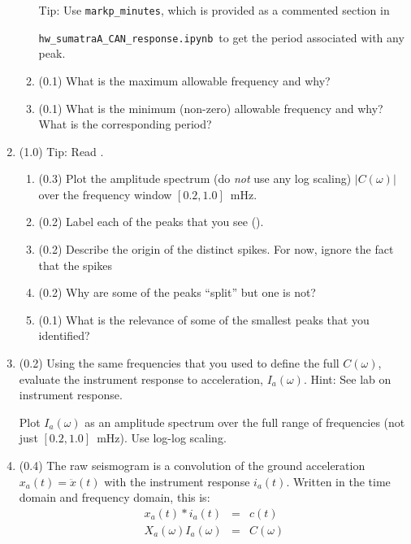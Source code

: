 \documentclass[11pt,titlepage,fleqn]{article}
\newcommand{\tfileresponse}{{\tt hw\_sumatraA\_CAN\_response.ipynb}}
\begin{document}
\begin{enumerate}
\begin{enumerate}
Tip: Use \verb+markp_minutes+, which is provided as a commented section in 

\tfileresponse\ to get the period associated with any peak.


\item (0.1) What is the maximum allowable frequency and why?
\item (0.1) What is the minimum (non-zero) allowable frequency and why? \\
What is the corresponding period?
\end{enumerate}


\item (1.0) Tip: Read \citet{Park2005}.

\begin{enumerate}
\item (0.3) Plot the amplitude spectrum (do {\em not} use any log scaling) $|C(\omega)|$ over the frequency window $[0.2,1.0]$~mHz.
\item (0.2) Label each of the peaks that you see (\eg {}).

\item (0.2) Describe the origin of the distinct spikes. For now, ignore the fact that the spikes 

\item (0.2) Why are some of the peaks ``split'' but one is not?

\item (0.1) What is the relevance of some of the smallest peaks that you identified?
\end{enumerate}


\item (0.2) Using the same frequencies that you used to define the full $C(\omega)$, evaluate the instrument response to acceleration, $I_a(\omega)$. Hint: See lab on instrument response.

Plot $I_a(\omega)$ as an amplitude spectrum over the full range of frequencies (not just $[0.2,1.0]$~mHz). Use log-log scaling.


\item (0.4) The raw seismogram is a convolution of the ground acceleration $x_a(t) = \ddot{x}(t)$ with the instrument response $i_a(t)$. Written in the time domain and frequency domain, this is:
%
\begin{eqnarray}
x_a(t) * i_a(t) &=& c(t)
\\
X_a(\omega) I_a(\omega) &=& C(\omega)
\end{eqnarray}


\end{enumerate}
\end{document}
